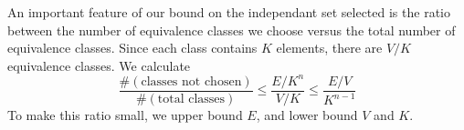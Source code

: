 \documentclass{article}
\theoremstyle{plain}
\theoremstyle{plain}
\begin{document}

An important feature of our bound on the independant set selected is the ratio between the number of equivalence classes we choose versus the total number of equivalence classes. Since each class contains $K$ elements, there are $V/K$ equivalence classes. We calculate
%
\[ \frac{\# (\text{classes not chosen})}{\# (\text{total classes})} \leq \frac{E/K^n}{V/K} \leq \frac{E/V}{K^{n-1}} \]
%
To make this ratio small, we upper bound $E$, and lower bound $V$ and $K$.



\end{document}
